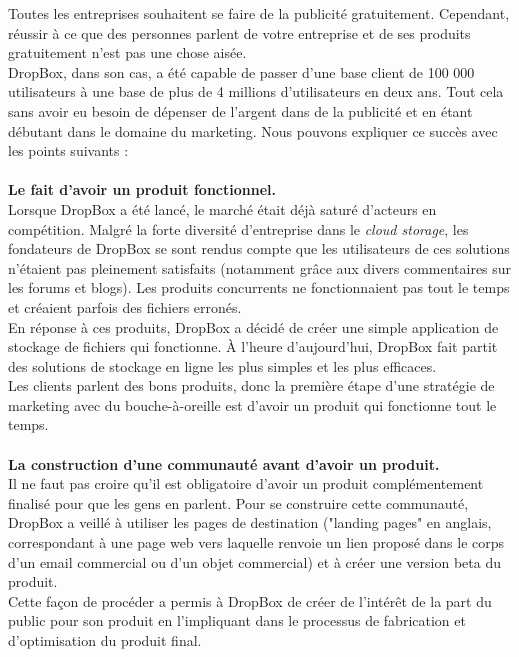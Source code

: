 \documentclass[a4paper, 10pt]{article}
\begin{document}
Toutes les entreprises souhaitent se faire de la publicité gratuitement.
Cependant, réussir à ce que des personnes parlent de votre entreprise et de ses produits gratuitement n'est pas une chose aisée.\\
DropBox, dans son cas, a été capable de passer d'une base client de 100 000 utilisateurs
à une base de plus de 4 millions d'utilisateurs en deux ans.
Tout cela sans avoir eu besoin de dépenser de l'argent dans de la publicité et en étant débutant dans le domaine du marketing.
Nous pouvons expliquer ce succès avec les points suivants :\\ \\
\textbf{Le fait d'avoir un produit fonctionnel.}\\
Lorsque DropBox a été lancé, le marché était déjà saturé d'acteurs en compétition.
Malgré la forte diversité d'entreprise dans le \textit{cloud storage}, les fondateurs de DropBox se sont rendus compte que 
les utilisateurs de ces solutions n'étaient pas pleinement satisfaits (notamment grâce aux divers commentaires sur les forums et blogs).
Les produits concurrents ne fonctionnaient pas tout le temps et créaient parfois des fichiers erronés.\\
En réponse à ces produits, DropBox a décidé de créer une simple application de stockage de fichiers qui fonctionne.
À l'heure d'aujourd'hui, DropBox fait partit des solutions de stockage en ligne les plus simples et les plus efficaces.\\
Les clients parlent des bons produits, donc la première étape d'une stratégie de marketing avec du bouche-à-oreille est d'avoir
un produit qui fonctionne tout le temps.\\ \\
\textbf{La construction d'une communauté avant d'avoir un produit.}\\
Il ne faut pas croire qu'il est obligatoire d'avoir un produit complémentement finalisé pour que les gens en parlent.
Pour se construire cette communauté, DropBox a veillé à utiliser les pages de destination ("landing pages" en anglais,
correspondant à une page web vers laquelle renvoie un lien proposé dans le corps d'un email commercial ou d'un objet commercial)
et à créer une version beta du produit.\\
Cette façon de procéder a permis à DropBox de créer de l'intérêt de la part du public pour son produit en l'impliquant dans le processus
de fabrication et d'optimisation du produit final.\\ \\
\end{document}
